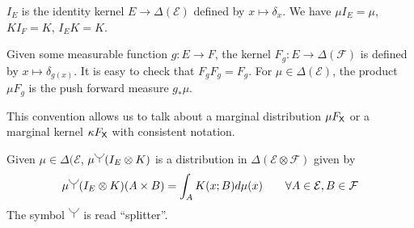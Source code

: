 $I_E$ is the identity kernel $E\to \Delta(\mathcal{E})$ defined by $x\mapsto \delta_x$. We have $\mu I_E=\mu$, $KI_F = K$, $I_E K = K$.

Given some measurable function $g:E\to F$, the kernel $F_g:E\to \Delta(\mathcal{F})$ is defined by $x\mapsto \delta_{g(x)}$. It is easy to check that $F_g F_g = F_g$. For $\mu\in \Delta(\mathcal{E})$, the product $\mu F_g$ is the push forward measure $g_*\mu$. 

This convention allows us to talk about a marginal distribution $\mu F_{\mathsf{X}}$ or a marginal kernel $\kappa F_{\mathsf{X}}$ with consistent notation.

Given $\mu\in \Delta(\mathcal{E}$, $\mu\splitter{0.15}(I_E\otimes K)$ is a distribution in $\Delta(\mathcal{E}\otimes\mathcal{F})$ given by
\begin{align}
    \mu\splitter{0.15}(I_E\otimes K)(A\times B) = \int_A K(x;B) d\mu(x)\qquad \forall A\in \mathcal{E},B\in \mathcal{F}
\end{align}
The symbol $\splitter{0.15}$ is read ``splitter''.




